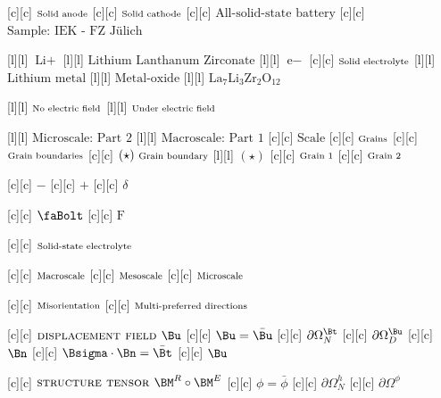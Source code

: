 [c][c] {$\text{\scriptsize Solid anode}$}
[c][c] {$\text{\scriptsize Solid cathode}$}
[c][c] {$\text{All-solid-state battery}$}
[c][c] {$\text{Sample: IEK - FZ Jülich}$}

[l][l] {$\text{Li}+$}
[l][l] {$\text{Lithium Lanthanum Zirconate}$}
[l][l] {$\text{e}-$}
[c][c] {$\text{\scriptsize Solid electrolyte}$}
[l][l] {$\text{Lithium metal}$}
[l][l] {$\text{Metal-oxide}$}
[l][l] {$\text{La}_{7}\text{Li}_{3}\text{Zr}_{2}\text{O}_{12}$}

[l][l] {$\text{\scriptsize  No electric field}$}
[l][l] {$\text{\scriptsize  Under electric field}$}

[l][l] {$\text{Microscale: Part 2}$}
[l][l] {$\text{Macroscale: Part 1}$}
[c][c] {$\text{Scale}$}
[c][c] {$\text{\scriptsize Grains}$}
[c][c] {$\text{\scriptsize Grain boundaries}$}
[c][c] {$(\star)\ \text{\scriptsize Grain boundary}$}
[l][l] {$(\star)$}
[c][c] {$\text{\scriptsize Grain 1}$}
[c][c] {$\text{\scriptsize Grain 2}$}

[c][c] {$-$}
[c][c] {$+$}
[c][c] {$\delta$}

[c][c] {$\text{\faBolt}$}
[c][c] {$\text{F}$}

[c][c] {$\text{\scriptsize Solid-state electrolyte}$}

[c][c] {$\text{\scriptsize Macroscale}$}
[c][c] {$\text{\scriptsize Mesoscale}$}
[c][c] {$\text{\scriptsize Microscale}$}


[c][c] {$\text{\scriptsize Misorientation}$}
[c][c] {$\text{\scriptsize Multi-preferred directions}$}

[c][c] {$\textsc{displacement field } \Bu$}
[c][c] {$\Bu=\bar{\Bu}$}
[c][c] {$\partial\Omega^{\Bt}_{N}$}
[c][c] {$\partial\Omega^{\Bu}_{D}$}
[c][c] {$\Bn$}
[c][c] {$\Bsigma\cdot\Bn = \bar{\Bt}$}
[c][c] {$\Bu$}


[c][c] {$\textsc{structure tensor } \BM^{R} \circ \BM^{E}$}
[c][c] {$\phi=\bar{\phi}$}
[c][c] {$\partial\Omega^{h}_{N}$}
[c][c] {$\partial\Omega^{\phi}$}


